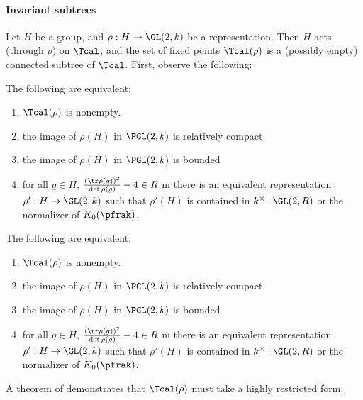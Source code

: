\documentclass[draft]{amsart}
\begin{document}
\paragraph*{Invariant subtrees}
Let $H$ be a group, and $\rho: H \to \GL(2,k)$ be a representation. Then $H$ acts (through $\rho$) on $\Tcal$, and the set of fixed points $\Tcal(\rho)$ is a (possibly empty) connected subtree of $\Tcal$. First, observe the following:
\begin{proposition}
    The following are equivalent:
    \begin{enumerate}
        \item $\Tcal(\rho)$ is nonempty.
        \item the image of $\rho(H)$ in $\PGL(2,k)$ is relatively compact
        \item the image of $\rho(H)$ in $\PGL(2,k)$ is bounded
        \item for all $g\in H$,  $\frac{(\tr\rho(g))^2}{\det \rho (g)}-4 \in R$
              \ite m there is an equivalent representation $\rho': H \to \GL(2,k)$ such that $\rho'(H)$ is contained in $k^\times\cdot \GL(2,R)$ or the normalizer of $K_0(\pfrak)$.
    \end{enumerate}
    The following are equivalent:
    \begin{enumerate}
        \item $\Tcal(\rho)$ is nonempty.
        \item the image of $\rho(H)$ in $\PGL(2,k)$ is relatively compact
        \item the image of $\rho(H)$ in $\PGL(2,k)$ is bounded
        \item for all $g\in H$,  $\frac{(\tr\rho(g))^2}{\det \rho (g)}-4 \in R$
              \ite m there is an equivalent representation $\rho': H \to \GL(2,k)$ such that $\rho'(H)$ is contained in $k^\times\cdot \GL(2,R)$ or the normalizer of $K_0(\pfrak)$.
    \end{enumerate}
\end{proposition}



A theorem of \cite{bellaicheSousgroupesGLArbres2014} demonstrates that $\Tcal(\rho)$ must take a highly restricted form.
\begin{proposition}


\end{proposition}

\end{document}
